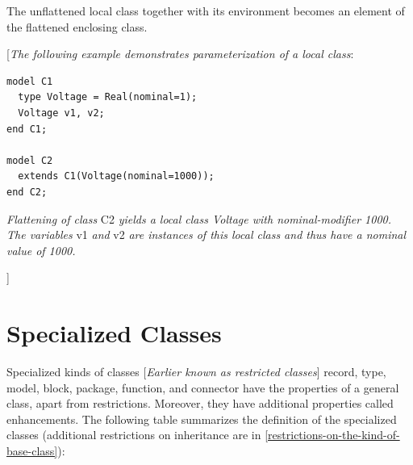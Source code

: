 \documentclass[10pt,a4paper]{report}
\def\doublelabel#1{\label{#1}\hypertarget{#1}{}}
\begin{document}
The unflattened local class together with its environment becomes an
element of the flattened enclosing class.

{[}\emph{The following example demonstrates parameterization of a local
class}:
\begin{lstlisting}[language=modelica]
model C1
  type Voltage = Real(nominal=1);
  Voltage v1, v2;
end C1;

model C2
  extends C1(Voltage(nominal=1000));
end C2;
\end{lstlisting}

\emph{Flattening of class} C2 \emph{yields a local class Voltage with
nominal-modifier 1000. The variables} v1 \emph{and} v2 \emph{are
instances of this local class and thus have a nominal value of 1000.}

{]}

\section{Specialized Classes}\doublelabel{specialized-classes}

Specialized kinds of classes {[}\emph{Earlier known as restricted
classes}{]} record, type, model, block, package, function, and connector
have the properties of a general class, apart from restrictions.
Moreover, they have additional properties called enhancements. The
following table summarizes the definition of the specialized classes
(additional restrictions on inheritance are in \ref{restrictions-on-the-kind-of-base-class}):
\end{document}
